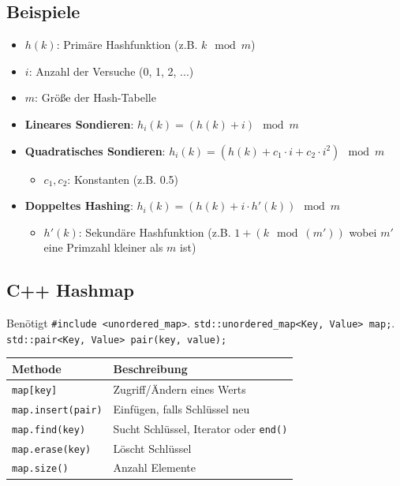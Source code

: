 \documentclass[9pt, a3paper, landscape]{article}
\newcommand{\formel}[1]{\ensuremath{#1}}
\newcommand{\datastruct}[1]{\textbf{\textcolor{red!60!black}{#1}}}
\begin{document}
\begin{multicols*}{4}
\begin{itemize}
\subsection*{Beispiele}

\begin{itemize}
    \item \formel{h(k)}: Primäre Hashfunktion (z.B. \formel{k \mod m})
    \item \formel{i}: Anzahl der Versuche (0, 1, 2, ...)
    \item \formel{m}: Größe der Hash-Tabelle
\end{itemize}

\noindent\hrulefill

\begin{itemize} 
\item \datastruct{Lineares Sondieren}: \formel{h_i(k) = (h(k) + i) \mod m}
\item \datastruct{Quadratisches Sondieren}: \formel{h_i(k) = (h(k) + c_1 \cdot i + c_2 \cdot i^2) \mod m}
\begin{itemize}
    \item \formel{c_1, c_2}: Konstanten (z.B. 0.5)
\end{itemize}
\item \datastruct{Doppeltes Hashing}: \formel{h_i(k) = (h(k) + i \cdot h'(k)) \mod m}

\begin{itemize}
    \item \formel{h'(k)}: Sekundäre Hashfunktion (z.B. \formel{1 + (k \mod (m'))} wobei \formel{m'} eine Primzahl kleiner als \formel{m} ist)
\end{itemize}
\end{itemize}

\subsection*{C++ Hashmap}
Benötigt \lstinline|#include <unordered_map>|. \lstinline|std::unordered_map<Key, Value> map;|. \lstinline|std::pair<Key, Value> pair(key, value);|

\noindent
\begin{tabularx}{\linewidth}{l >{\RaggedRight}X}
\toprule
\textbf{Methode} & \textbf{Beschreibung} \\
\midrule
\lstinline|map[key]| & Zugriff/Ändern eines Werts \\
\lstinline|map.insert(pair)| & Einfügen, falls Schlüssel neu \\
\lstinline|map.find(key)| & Sucht Schlüssel, Iterator oder \lstinline|end()| \\
\lstinline|map.erase(key)| & Löscht Schlüssel \\
\lstinline|map.size()| & Anzahl Elemente \\
\bottomrule
\end{tabularx}


\end{itemize}
\end{multicols*}
\end{document}
